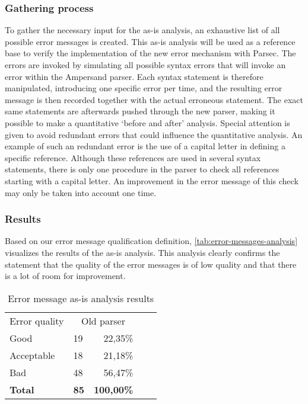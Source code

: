 \subsubsection{Gathering process}

To gather the necessary input for the as-is analysis, an exhaustive list of all possible error messages is created.
This as-is analysis will be used as a reference base to verify the implementation of the new error mechanism with Parsec.
The errors are invoked by simulating all possible syntax errors that will invoke an error within the Ampersand parser.
Each syntax statement is therefore manipulated, introducing one specific error per time, and the resulting error message is then recorded together with the actual erroneous statement.
The exact same statements are afterwards pushed through the new parser, making it possible to make a quantitative `before and after' analysis.
Special attention is given to avoid redundant errors that could influence the quantitative analysis. 
An example of such an redundant error is the use of a capital letter in defining a specific reference. 
Although these references are used in several syntax statements, there is only one procedure in the parser to check all references starting with a capital letter.
An improvement in the error message of this check may only be taken into account one time.

\subsubsection{Results}
Based on our error message qualification definition, \autoref{tab:error-messages-analysis} visualizes the results of the as-is analysis.
This analysis clearly confirms the statement that the quality of the error messages is of low quality and that there is a lot of room for improvement.

\begin{table}[h]
  \centering
	\begin{tabular}{llrlr}
    Error quality  & \multicolumn{2}{c}{Old parser}     \\
		Good           & 19          & 22,35\%         \\
		Acceptable        & 18          & 21,18\%       \\
		Bad            & 48          & 56,47\%           \\
		\rowcolor[HTML]{BBBBBB}
		\textbf{Total} & \textbf{85} & \textbf{100,00\%} 
	\end{tabular}
  \caption{Error message as-is analysis results}
  \label{tab:error-messages-analysis}
\end{table}

